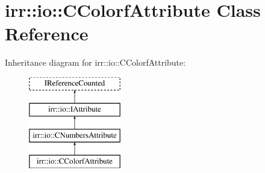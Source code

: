 \hypertarget{classirr_1_1io_1_1_c_colorf_attribute}{\section{irr\-:\-:io\-:\-:C\-Colorf\-Attribute Class Reference}
\label{classirr_1_1io_1_1_c_colorf_attribute}
}
Inheritance diagram for irr\-:\-:io\-:\-:C\-Colorf\-Attribute\-:\begin{figure}[H]
\begin{center}
\leavevmode
\includegraphics[height=4.000000cm]{classirr_1_1io_1_1_c_colorf_attribute}
\end{center}
\end{figure}
